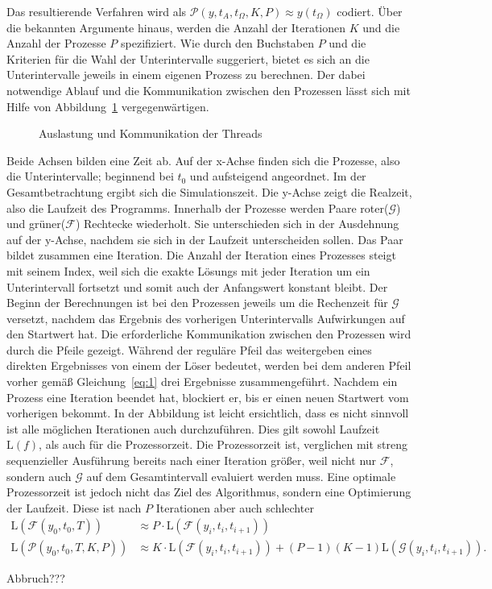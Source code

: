 Das resultierende Verfahren wird als \(\mathcal{P}\!\left(y, t_{A}, t_{\Omega},K,P\right) \approx y(t_\Omega)\) codiert. Über die bekannten Argumente hinaus, werden die Anzahl der Iterationen \(K\) und die Anzahl der Prozesse \(P\) spezifiziert. Wie durch den Buchstaben \(P\) und die Kriterien für die Wahl der Unterintervalle suggeriert, bietet es sich an die Unterintervalle jeweils in einem eigenen Prozess zu berechnen. Der dabei notwendige Ablauf und die Kommunikation zwischen den Prozessen lässt sich mit Hilfe von Abbildung~\ref{fig:sequence} vergegenwärtigen.
\begin{figure}[ht]
    \centering
        
    \caption{Auslastung und Kommunikation der Threads}
    \label{fig:sequence}
\end{figure}
Beide Achsen bilden eine Zeit ab. Auf der x-Achse finden sich die Prozesse, also die Unterintervalle; beginnend bei \(t_0\) und aufsteigend angeordnet. Im der Gesamtbetrachtung ergibt sich die Simulationszeit. Die y-Achse zeigt die Realzeit, also die Laufzeit des Programms. Innerhalb der Prozesse werden Paare roter(\(\mathcal{G}\)) und grüner(\(\mathcal{F}\)) Rechtecke wiederholt. Sie unterschieden sich in der Ausdehnung auf der y-Achse, nachdem sie sich in der Laufzeit unterscheiden sollen. Das Paar bildet zusammen eine Iteration. Die Anzahl der Iteration eines Prozesses steigt mit seinem Index, weil sich die exakte Lösungs mit jeder Iteration um ein Unterintervall fortsetzt und somit auch der Anfangswert konstant bleibt. Der Beginn der Berechnungen ist bei den Prozessen jeweils um die Rechenzeit für \(\mathcal{G}\) versetzt, nachdem das Ergebnis des vorherigen Unterintervalls Aufwirkungen auf den Startwert hat. Die erforderliche Kommunikation zwischen den Prozessen wird durch die Pfeile gezeigt. Während der reguläre Pfeil das weitergeben eines direkten Ergebnisses von einem der Löser bedeutet, werden bei dem anderen Pfeil vorher gemäß Gleichung~\ref{eq:1} drei Ergebnisse zusammengeführt. Nachdem ein Prozess eine Iteration beendet hat, blockiert er, bis er einen neuen Startwert vom vorherigen bekommt. In der Abbildung ist leicht ersichtlich, dass es nicht sinnvoll ist alle möglichen Iterationen auch durchzuführen. Dies gilt sowohl Laufzeit \(\mathrm{L}(f)\), als auch für die Prozessorzeit. Die Prozessorzeit ist, verglichen mit streng sequenzieller Ausführung bereits nach einer Iteration größer, weil nicht nur \(\mathcal{F}\), sondern auch \(\mathcal{G}\) auf dem Gesamtintervall evaluiert werden muss. Eine optimale Prozessorzeit ist jedoch nicht das Ziel des Algorithmus, sondern eine Optimierung der Laufzeit. Diese ist nach \(P\) Iterationen aber auch schlechter
\begin{align*}
    \mathrm{L}\!\left(\mathcal{F}\!\!\left(y_0, t_0, T\right)\right)
    &\approx P \cdot \mathrm{L}\!\left(\mathcal{F}\!\!\left(y_i, t_i, t_{i+1}\right)\right)\\
    \mathrm{L}\!\left(\mathcal{P}\!\!\left(y_0, t_0, T, K, P\right)\right)
    &\approx K \cdot \mathrm{L}\!\left(\mathcal{F}\!\!\left(y_i, t_i, t_{i+1}\right)\right) + (P-1) (K-1) \mathrm{L}\!\left(\mathcal{G}\!\!\left(y_i, t_i, t_{i+1}\right)\right).
\end{align*}

Abbruch???
